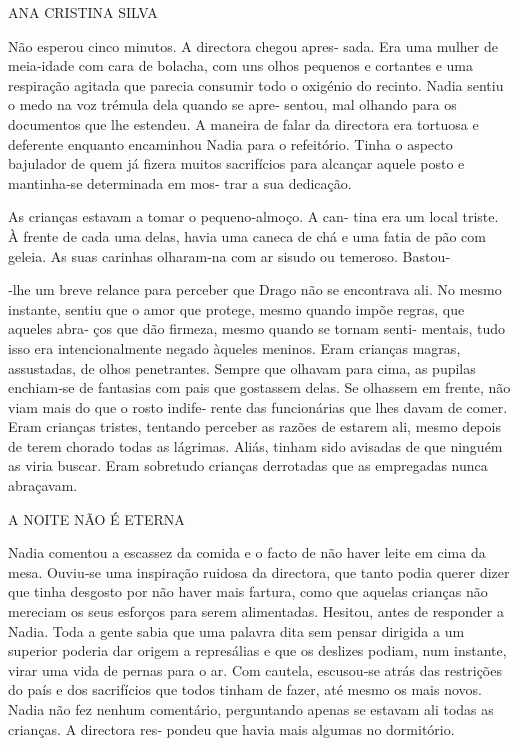 ANA CRISTINA SILVA

Não esperou cinco minutos. A directora chegou apres‑ sada. Era uma
mulher de meia‑idade com cara de bolacha, com uns olhos pequenos e
cortantes e uma respiração agitada que parecia consumir todo o oxigénio
do recinto. Nadia sentiu o medo na voz trémula dela quando se apre‑
sentou, mal olhando para os documentos que lhe estendeu. A maneira de
falar da directora era tortuosa e deferente enquanto encaminhou Nadia
para o refeitório. Tinha o aspecto bajulador de quem já fizera muitos
sacrifícios para alcançar aquele posto e mantinha‑se determinada em mos‑
trar a sua dedicação.

As crianças estavam a tomar o pequeno‑almoço. A can‑ tina era um local
triste. À frente de cada uma delas, havia uma caneca de chá e uma fatia
de pão com geleia. As suas carinhas olharam‑na com ar sisudo ou
temeroso. Bastou‑

‑lhe um breve relance para perceber que Drago não se encontrava ali. No
mesmo instante, sentiu que o amor que protege, mesmo quando impõe
regras, que aqueles abra‑ ços que dão firmeza, mesmo quando se tornam
senti‑ mentais, tudo isso era intencionalmente negado àqueles meninos.
Eram crianças magras, assustadas, de olhos penetrantes. Sempre que
olhavam para cima, as pupilas enchiam‑se de fantasias com pais que
gostassem delas. Se olhassem em frente, não viam mais do que o rosto
indife‑ rente das funcionárias que lhes davam de comer. Eram crianças
tristes, tentando perceber as razões de estarem ali, mesmo depois de
terem chorado todas as lágrimas. Aliás, tinham sido avisadas de que
ninguém as viria buscar. Eram sobretudo crianças derrotadas que as
empregadas nunca abraçavam.

A NOITE NÃO É ETERNA

Nadia comentou a escassez da comida e o facto de não haver leite em cima
da mesa. Ouviu‑se uma inspiração ruidosa da directora, que tanto podia
querer dizer que tinha desgosto por não haver mais fartura, como que
aquelas crianças não mereciam os seus esforços para serem alimentadas.
Hesitou, antes de responder a Nadia. Toda a gente sabia que uma palavra
dita sem pensar dirigida a um superior poderia dar origem a represálias
e que os deslizes podiam, num instante, virar uma vida de pernas para o
ar. Com cautela, escusou‑se atrás das restrições do país e dos
sacrifícios que todos tinham de fazer, até mesmo os mais novos. Nadia
não fez nenhum comentário, perguntando apenas se estavam ali todas as
crianças. A directora res‑ pondeu que havia mais algumas no dormitório.

